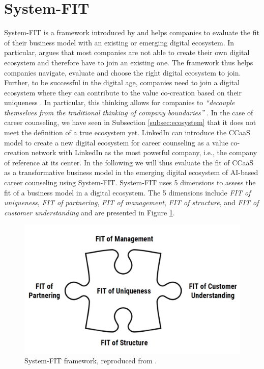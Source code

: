 \section{System-FIT}
\label{sec:system_fit}

System-FIT is a framework introduced by \citet{griederDigitalEcosystemHow2019,schwafertsDigitalBusinessDevelopment2020}
and helps companies to evaluate the fit of their business model with an existing or emerging digital ecosystem.
In particular, \cite{schwafertsDigitalBusinessDevelopment2020} argues that most companies are not able
to create their own digital ecosystem and therefore have to join an existing one. The framework
thus helps companies navigate, evaluate and choose the right digital ecosystem to join. 
Further, to be successful in the digital age, companies need to join a digital ecosystem where they can contribute 
to the value co-creation based on their uniqueness \citep{griederDigitalEcosystemHow2019}.
In particular, this thinking allows for companies to \textit{``decouple themselves from the traditional thinking of
company boundaries''} \citep[p.~42]{griederDigitalEcosystemHow2019}.
In the case of career counseling, we have seen in Subsection \ref{subsec:ecosystem} that it
does not meet the definition of a true ecosystem yet. LinkedIn can introduce the CCaaS model to 
create a new digital ecosystem for career counseling as a value co-creation network with LinkedIn
as the most powerful company, i.e., the company of reference at its center. In the following we will thus evaluate
the fit of CCaaS as a transformative business model in the emerging digital ecosystem of AI-based career counseling
using System-FIT. System-FIT uses 5 dimensions to assess the fit of a business model in a digital ecosystem.
The 5 dimensions include \textit{FIT of uniqueness}, \textit{FIT of partnering}, \textit{FIT of management},
\textit{FIT of structure}, and \textit{FIT of customer understanding} and are presented in Figure \ref{fig:system_fit}.

\begin{figure}[h!]
    \centering
    \caption{System-FIT framework, reproduced from \citep[p.~54]{griederDigitalEcosystemHow2019}.}
    \label{fig:system_fit}
    \includegraphics[width=0.7\linewidth]{figures/system-fit.png}
\end{figure}


